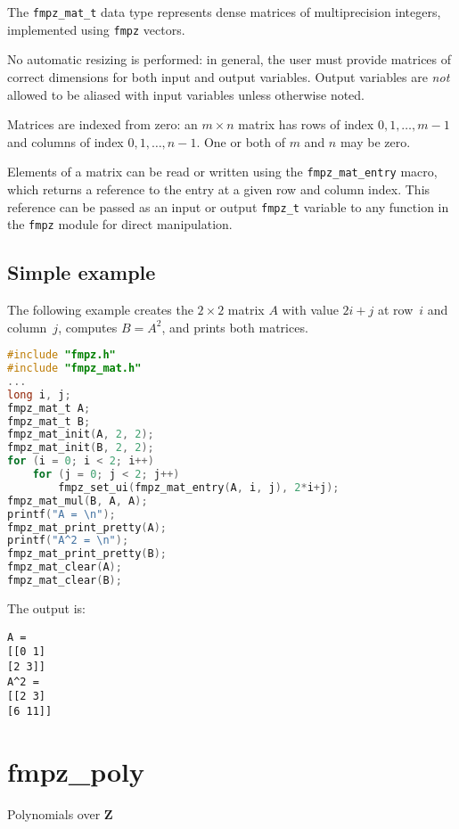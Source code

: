 \documentclass[a4paper,10pt]{book}
\newcommand{\Z}{\mathbf{Z}}%
\newcommand{\code}{\lstinline}
\begin{document}
The \code{fmpz_mat_t} data type represents dense matrices of multiprecision
integers, implemented using \code{fmpz} vectors.

No automatic resizing is performed: in general, the user must provide
matrices of correct dimensions for both input and output variables. Output
variables are \emph{not} allowed to be aliased with input variables unless
otherwise noted.

Matrices are indexed from zero: an $m \times n$ matrix
has rows of index $0,1,\ldots,m-1$ and columns of
index $0,1,\ldots,n-1$. One or both of $m$ and $n$ may be zero.

Elements of a matrix can be read or written using the \code{fmpz_mat_entry}
macro, which returns a reference to the entry at a given row and column index.
This reference can be passed as an input or output \code{fmpz_t} variable to 
any function in the \code{fmpz} module for direct manipulation.

\section{Simple example}
The following example creates the $2 \times 2$ matrix $A$ with
value $2i+j$ at row~$i$ and column~$j$, computes $B = A^2$,
and prints both matrices.

\begin{lstlisting}[language=c]
#include "fmpz.h"
#include "fmpz_mat.h"
...
long i, j;
fmpz_mat_t A;
fmpz_mat_t B;
fmpz_mat_init(A, 2, 2);
fmpz_mat_init(B, 2, 2);
for (i = 0; i < 2; i++)
    for (j = 0; j < 2; j++)
        fmpz_set_ui(fmpz_mat_entry(A, i, j), 2*i+j);
fmpz_mat_mul(B, A, A);
printf("A = \n");
fmpz_mat_print_pretty(A);
printf("A^2 = \n");
fmpz_mat_print_pretty(B);
fmpz_mat_clear(A);
fmpz_mat_clear(B);
\end{lstlisting}

The output is:
\begin{lstlisting}
A = 
[[0 1]
[2 3]]
A^2 = 
[[2 3]
[6 11]]
\end{lstlisting}





\chapter{fmpz\_poly}
\epigraph{Polynomials over $\Z$}{}
\end{document}

